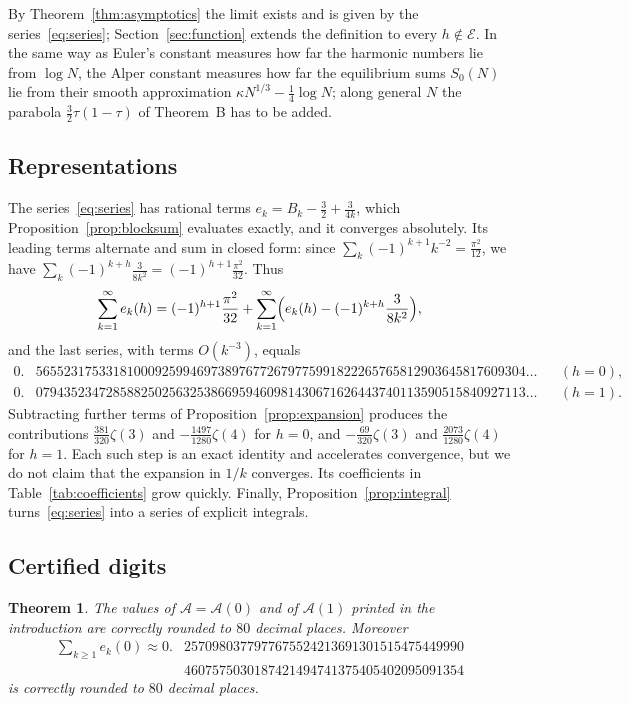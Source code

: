 \documentclass[11pt]{article}
\newtheorem{theorem}{Theorem}[section]
\theoremstyle{definition}
\theoremstyle{remark}
\newcommand{\Alp}{\mathcal{A}}
\begin{document}
By Theorem~\ref{thm:asymptotics} the limit exists and is given by the
series~\eqref{eq:series}; Section~\ref{sec:function} extends the
definition to every $h\notin\mathcal E$. In the same way as Euler's constant measures
how far the harmonic numbers lie from $\log N$, the Alper constant
measures how far the equilibrium sums $S_0(N)$ lie from their smooth
approximation $\kappa N^{1/3}-\frac14\log N$; along general $N$ the
parabola $\frac32\tau(1-\tau)$ of Theorem~B has to be added.

\subsection*{Representations}

The series~\eqref{eq:series} has rational terms
$e_k=B_k-\frac32+\frac3{4k}$, which Proposition~\ref{prop:blocksum}
evaluates exactly, and it converges absolutely. Its leading terms
alternate and sum in closed form: since
$\sum_k(-1)^{k+1}k^{-2}=\frac{\pi^2}{12}$, we have
$\sum_k(-1)^{k+h}\frac3{8k^2}=(-1)^{h+1}\frac{\pi^2}{32}$. Thus
\[
\sum_{k=1}^\infty e_k(h)=(-1)^{h+1}\frac{\pi^2}{32}+\sum_{k=1}^\infty
\Bigl(e_k(h)-(-1)^{k+h}\frac{3}{8k^2}\Bigr),
\]
and the last series, with terms $O(k^{-3})$, equals
\[
\begin{aligned}
0.&5655231753318100092599469738976772679775991822265765812903645817609304\ldots
&&(h=0),\\
0.&0794352347285882502563253866959460981430671626443740113590515840927113\ldots
&&(h=1).
\end{aligned}
\]
Subtracting further terms of Proposition~\ref{prop:expansion} produces
the contributions $\frac{381}{320}\zeta(3)$ and $-\frac{1497}{1280}\zeta(4)$
for $h=0$, and $-\frac{69}{320}\zeta(3)$ and $\frac{2073}{1280}\zeta(4)$
for $h=1$. Each such step is an exact identity and accelerates
convergence, but we do not claim that the expansion in $1/k$ converges.
Its coefficients in Table~\ref{tab:coefficients} grow quickly. Finally,
Proposition~\ref{prop:integral} turns~\eqref{eq:series} into a series of
explicit integrals.

\subsection*{Certified digits}

\begin{theorem}\label{thm:digits}
The values of $\Alp=\Alp(0)$ and of $\Alp(1)$ printed in the
introduction are correctly rounded to $80$ decimal places. Moreover
\[
\begin{aligned}
\sum_{k\ge1}e_k(0)\approx0.&2570980377977675524213691301515475449990\\
&4607575030187421494741375405402095091354
\end{aligned}
\]
is correctly rounded to $80$ decimal places.
\end{theorem}
\end{document}
